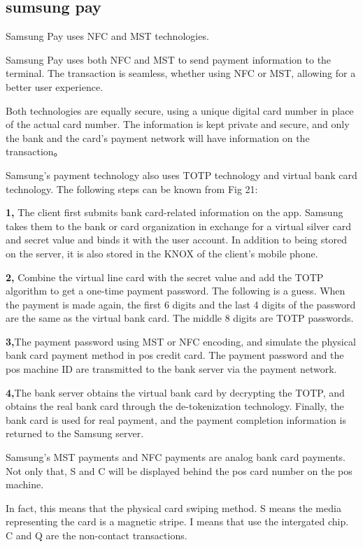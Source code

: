 \documentclass[journal]{IEEEtran}
\begin{document}
\subsection{sumsung pay}
Samsung Pay uses NFC and MST technologies. 

Samsung Pay uses both NFC and MST to send payment information to the terminal. The transaction is seamless, whether using NFC or MST, allowing for a better user experience.

Both technologies are equally secure, using a unique digital card number in place of the actual card number. The information is kept private and secure, and only the bank and the card's payment network will have information on the transaction。

Samsung's payment technology also uses TOTP technology and virtual bank card technology. The following steps can be known from Fig 21:

\textbf{1, }The client first submits bank card-related information on the app. Samsung takes them to the bank or card organization in exchange for a virtual silver card and secret value and binds it with the user account. In addition to being stored on the server, it is also stored in the KNOX of the client's mobile phone.

\textbf{2, }Combine the virtual line card with the secret value and add the TOTP algorithm to get a one-time payment password. The following is a guess. When the payment is made again, the first 6 digits and the last 4 digits of the password are the same as the virtual bank card. The middle 8 digits are TOTP passwords.

\textbf{3,}The payment password using MST or NFC encoding, and simulate the physical bank card payment method in pos credit card. The payment password and the pos machine ID are transmitted to the bank server via the payment network.

\textbf{4,}The bank server obtains the virtual bank card by decrypting the TOTP, and obtains the real bank card through the de-tokenization technology. Finally, the bank card is used for real payment, and the payment completion information is returned to the Samsung server.

Samsung's MST payments and NFC payments are analog bank card payments. Not only that, S and C will be displayed behind the pos card number on the pos machine.

In fact, this means that the physical card swiping method. S means the media representing the card is a magnetic stripe. I means that use the intergated chip. C and Q are the non-contact transactions.
\end{document}
